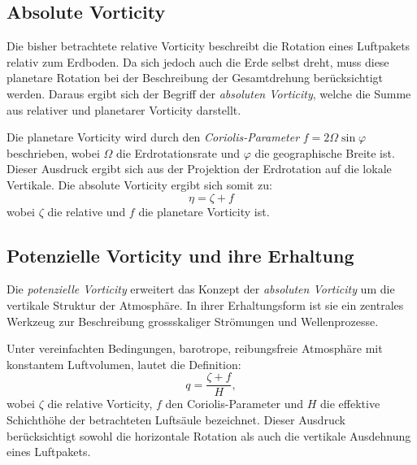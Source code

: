 \subsection{Absolute Vorticity}

Die bisher betrachtete relative Vorticity beschreibt die Rotation eines
Luftpakets relativ zum Erdboden. Da sich jedoch auch die Erde selbst dreht,
muss diese planetare Rotation bei der Beschreibung der Gesamtdrehung
berücksichtigt werden. Daraus ergibt sich der Begriff der \emph{absoluten
    Vorticity}, welche die Summe aus relativer und planetarer Vorticity darstellt.

Die planetare Vorticity wird durch den \emph{Coriolis-Parameter} \(
f = 2 \Omega \sin \varphi \) beschrieben, wobei \( \Omega \) die
Erdrotationsrate und \( \varphi \) die geographische Breite ist. Dieser
Ausdruck ergibt sich aus der Projektion der Erdrotation auf die lokale
Vertikale. Die absolute Vorticity ergibt sich somit zu:
\begin{equation}
    \eta = \zeta + f
    \label{rossby:eq:absolute_vorticity}
\end{equation}
wobei \( \zeta \) die relative und \( f \) die planetare Vorticity ist.


\subsection{Potenzielle Vorticity und ihre Erhaltung}

Die \emph{potenzielle Vorticity} erweitert das Konzept der \emph{absoluten
    Vorticity} um die vertikale Struktur der Atmosphäre. In ihrer Erhaltungsform
ist sie ein zentrales Werkzeug zur Beschreibung grossskaliger Strömungen und
Wellenprozesse.

Unter vereinfachten Bedingungen, barotrope, reibungsfreie Atmosphäre mit
konstantem Luftvolumen, lautet die Definition:
\begin{equation}
    q = \frac{\zeta + f}{H},
    \label{rossby:eq:potential_vorticity}
\end{equation}
wobei \(\zeta\) die relative Vorticity, \(f\) den Coriolis-Parameter und \(H\) die effektive Schichthöhe der betrachteten Luftsäule bezeichnet.
Dieser Ausdruck berücksichtigt sowohl die horizontale Rotation als auch die vertikale Ausdehnung eines Luftpakets.

